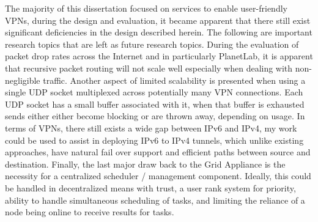 The majority of this dissertation focused on services to enable user-friendly
VPNs, during the design and evaluation, it became apparent that there still
exist significant deficiencies in the design described herein.  The following
are important research topics that are left as future research topics.  During
the evaluation of packet drop rates across the Internet and in particularly
PlanetLab, it is apparent that recursive packet routing will not scale well
especially when dealing with non-negligible traffic.  Another aspect of limited
scalability is presented when using a single UDP socket multiplexed across
potentially many VPN connections.  Each UDP socket has a small buffer
associated with it, when that buffer is exhausted sends either either become
blocking or are thrown away, depending on usage.  In terms of VPNs, there still
exists a wide gap between IPv6 and IPv4, my work could be used to assist in
deploying IPv6 to IPv4 tunnels, which unlike existing approaches, have natural
fail over support and efficient paths between source and destination.  Finally,
the last major draw back to the Grid Appliance is the necessity for a
centralized scheduler / management component.  Ideally, this could be handled
in decentralized means with trust, a user rank system for priority, ability to
handle simultaneous scheduling of tasks, and limiting the reliance of a node
being online to receive results for tasks.
